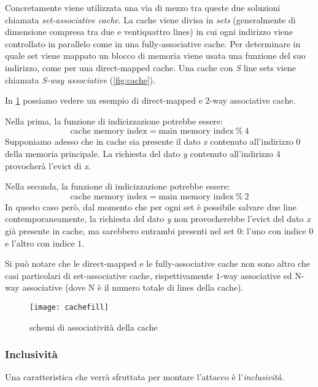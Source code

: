				Concretamente viene utilizzata una via di mezzo tra queste due soluzioni chiamata \emph{set-associative cache}. La cache viene divisa in \emph{sets} (generalmente di dimensione compresa tra due e ventiquattro lines) in cui ogni indirizzo viene controllato in parallelo come in una fully-associative cache. Per determinare in quale set viene mappato un blocco di memoria viene usata una funzione del suo indirizzo, come per una direct-mapped cache. Una cache con \emph{S} line sets viene chiamata \emph{S-way associative} (\cref{fig:cache}). 
				
				In \cref{fig:cachefill} possiamo vedere un esempio di direct-mapped e $2$-way associative cache. 
				
				Nella prima, la funzione di indicizzazione potrebbe essere: $$\text{cache memory index} = \text{main memory index}\ \% \ 4$$ Supponiamo adesso che in cache sia presente il dato \emph{x} contenuto all'indirizzo $0$ della memoria principale. La richiesta del dato \emph{y} contenuto all'indirizzo $4$ provocherà l'evict di \emph{x}.
				
				Nella seconda, la funzione di indicizzazione potrebbe essere: $$\text{cache memory index} = \text{main memory index}\ \% \ 2$$ In questo caso però, dal momento che per ogni set è possibile salvare due line contemporaneamente, la richiesta del dato \emph{y} non provocherebbe l'evict del dato \emph{x} già presente in cache, ma sarebbero entrambi presenti nel set $0$: l'uno con indice $0$ e l'altro con indice $1$.
				
				Si può notare che le direct-mapped e le fully-associative cache non sono altro che casi particolari di set-associative cache, rispettivamente $1$-way associative ed N-way associative (dove N è il numero totale di lines della cache).
				
				\begin{figure}
					\begin{center}
						\texttt{[image: cachefill]}
						\caption{schemi di associatività della cache}
						\label{fig:cachefill}
					\end{center}
				\end{figure}
				
			\subsubsection{Inclusività}
				Una caratteristica che verrà sfruttata per montare l'attacco è l'\emph{inclusività}. 
				
